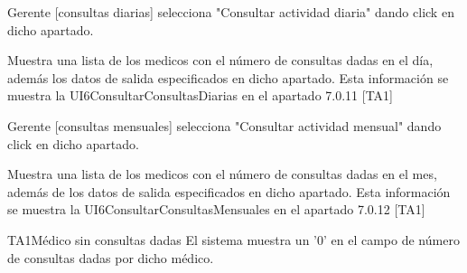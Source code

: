 \begin{UCtrayectoria}{Gerente  [consultas diarias]}
        \UCpaso[\UCactor] selecciona "Consultar actividad diaria" dando click en dicho apartado.
        
        \UCpaso Muestra una lista de los medicos con el número de consultas dadas en el día, además los datos de salida especificados en dicho apartado. Esta información se muestra la UI6ConsultarConsultasDiarias   en el apartado 7.0.11 [TA1]

\end{UCtrayectoria}

\begin{UCtrayectoria}{Gerente  [consultas mensuales]}
        \UCpaso[\UCactor] selecciona "Consultar actividad mensual" dando click en dicho apartado.
        
        \UCpaso Muestra una lista de los medicos con el número de consultas dadas en el mes, además de los datos de salida especificados en dicho apartado. Esta información se muestra  la UI6ConsultarConsultasMensuales en el apartado 7.0.12 [TA1]

\end{UCtrayectoria}

\begin{UCtrayectoriaA}{TA1}{Médico sin consultas dadas}
    \UCpaso El sistema muestra un '0' en el campo de número de consultas dadas por dicho médico.
    
   \end{UCtrayectoriaA}
 
